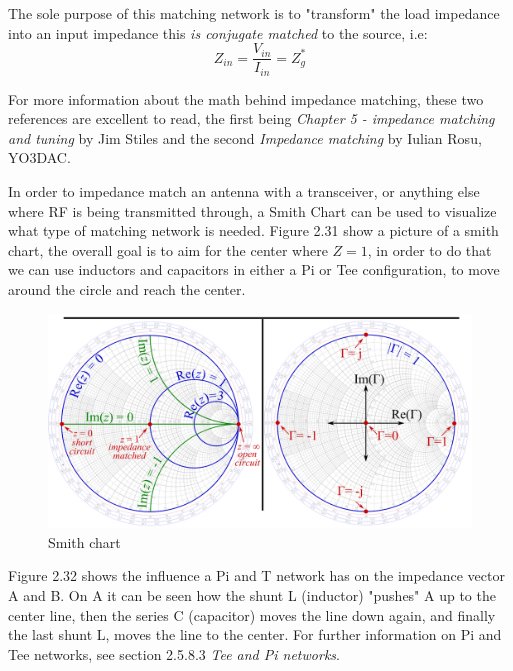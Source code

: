 The sole purpose of this matching network is to "transform" the load impedance into an input impedance this \textit{is conjugate matched} to the source, i.e:
\begin{equation}
   Z_{in} = \frac{V_{in}}{I_{in}}=Z_g^*
\end{equation}

For more information about the math behind impedance matching, these two references are excellent to read, the first being \textit{Chapter 5 - impedance matching and tuning} by Jim Stiles\cite{ImpedanceMatching1} and the second \textit{Impedance matching} by Iulian Rosu, YO3DAC\cite{ImpedanceMatching2}.

In order to impedance match an antenna with a transceiver, or anything else where RF is being transmitted through, a Smith Chart can be used to visualize what type of matching network is needed. Figure 2.31 show a picture of a smith chart, the overall goal is to aim for the center where $Z=1$, in order to do that we can use inductors and capacitors in either a Pi or Tee configuration, to move around the circle and reach the center. 

\begin{figure}[h]
\centering
\includegraphics[scale=0.4]{figures/SmithChart.png}
\caption{Smith chart\cite{SmithChart}}
\end{figure}

Figure 2.32 shows the influence a Pi and T network has on the impedance vector A and B. On A it can be seen how the shunt L (inductor) "pushes" A up to the center line, then the series C (capacitor) moves the line down again, and finally the last shunt L, moves the line to the center. For further information on Pi and Tee networks, see section 2.5.8.3 \textit{Tee and Pi networks}.  

